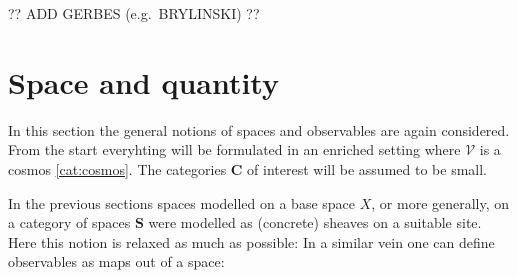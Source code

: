     ?? ADD GERBES (e.g.~BRYLINSKI) ??

\section{Space and quantity}

    In this section the general notions of spaces and observables are again considered. From the start everyhting will be formulated in an enriched setting where $\mathcal{V}$ is a cosmos \ref{cat:cosmos}. The categories $\mathbf{C}$ of interest will be assumed to be small.

    In the previous sections spaces modelled on a base space $X$, or more generally, on a category of spaces $\mathbf{S}$ were modelled as (concrete) sheaves on a suitable site. Here this notion is relaxed as much as possible:
    In a similar vein one can define observables as maps out of a space:

